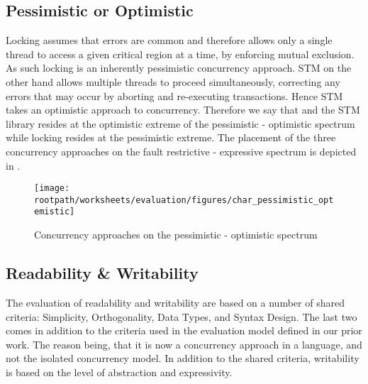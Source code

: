 \subsection{Pessimistic or Optimistic}
Locking assumes that errors are common and therefore allows only a single thread to access a given critical region at a time, by enforcing mutual exclusion. As such locking is an inherently pessimistic concurrency approach. \ac{STM} on the other hand allows multiple threads to proceed simultaneously, correcting any errors that may occur by aborting and re-executing transactions. Hence \ac{STM} takes an optimistic approach to concurrency.
Therefore we say that \stmnamesp and the \ac{STM} library resides at the optimistic extreme of the pessimistic - optimistic spectrum while locking resides at the pessimistic extreme. The placement of the three concurrency approaches on the fault restrictive - expressive spectrum is depicted in . 
\begin{figure}[htbp]
\centering
 \texttt{[image: \\rootpath/worksheets/evaluation/figures/char\_pessimistic\_optemistic]} 
 \caption{Concurrency approaches on the pessimistic - optimistic spectrum}
\label{fig:char_pes_opti}
\end{figure}

\subsection{Readability \& Writability}\label{subsec:tl_charac_read_and_write}
The evaluation of readability and writability are based on a number of shared criteria: Simplicity, Orthogonality, Data Types, and Syntax Design. The last two comes in addition to the criteria used in the evaluation model defined in our prior work\cite[p. 16-21]{dpt907e14trending}. The reason being, that it is now a concurrency approach in a language, and not the isolated concurrency model. In addition to the shared criteria, writability is based on the level of abstraction and expressivity.
